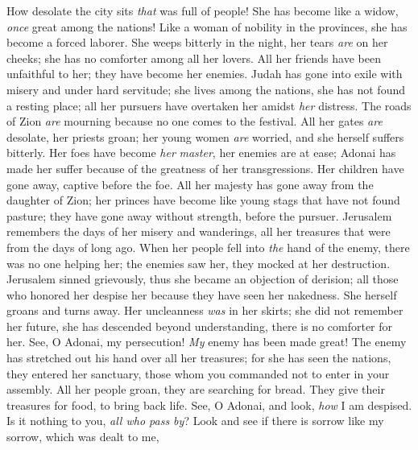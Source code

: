
\begin{biblechapter} %
 How desolate the city sits 
\textit{that} was full of people! 
She has become like a widow, 
\textit{once} great among the nations! 
Like a woman of nobility in the provinces, 
she has become a forced laborer.
\verse She weeps bitterly in the night, 
her tears \textit{are} on her cheeks; 
she has no comforter 
among all her lovers. 
All her friends have been unfaithful to her; 
they have become her enemies.
\verse Judah has gone into exile with misery 
and under hard servitude; 
she lives among the nations, 
she has not found a resting place; 
all her pursuers have overtaken her 
amidst \textit{her} distress.
\verse The roads of Zion \textit{are} mourning 
because no one comes to the festival. 
All her gates \textit{are} desolate, 
her priests groan; 
her young women \textit{are} worried, 
and she herself suffers bitterly.
\verse Her foes have become \textit{her} \textit{master}, 
her enemies are at ease; 
Adonai has made her suffer 
because of the greatness of her transgressions. 
Her children have gone away, 
captive before the foe.
\verse All her majesty has gone away 
from the daughter of Zion; 
her princes have become like young stags 
that have not found pasture; 
they have gone away without strength, 
before the pursuer.
\verse Jerusalem remembers 
the days of her misery and wanderings, 
all her treasures 
that were from the days of long ago. 
When her people fell into \textit{the} hand of the enemy, 
there was no one helping her; 
the enemies saw her, they mocked 
at her destruction.
\verse Jerusalem sinned grievously, 
thus she became an objection of derision; 
all those who honored her despise her 
because they have seen her nakedness. 
She herself groans 
and turns away.
\verse Her uncleanness \textit{was} in her skirts; 
she did not remember her future, 
she has descended beyond understanding, 
there is no comforter for her. 
See, O Adonai, my persecution! 
\textit{My} enemy has been made great!
\verse The enemy has stretched out his hand 
over all her treasures; 
for she has seen the nations, 
they entered her sanctuary, 
those whom you commanded not to enter 
in your assembly.
\verse All her people groan, 
they are searching for bread. 
They give their treasures for food, 
to bring back life. 
See, O Adonai, and look, 
\textit{how} I am despised.
\verse Is it nothing to you, \textit{all who pass by}? 
Look and see 
if there is sorrow like my sorrow, 
which was dealt to me, 

\end{biblechapter}
